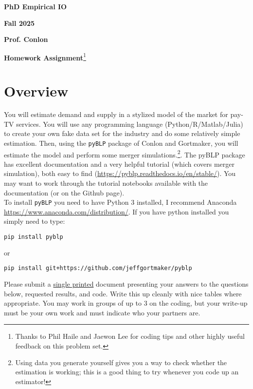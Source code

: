 \documentclass[english,11pt]{article}
\begin{document}
\begin{center}
\textbf{PhD Empirical IO}

\textbf{Fall 2025}

\textbf{Prof. Conlon}

\textbf{Homework Assignment}\footnote{Thanks to Phil Haile and Jaewon Lee for coding tips and other highly useful feedback on this problem set.}


\end{center}

\bigskip

\section*{Overview}

You will estimate demand and supply in a stylized model of the market for
pay-TV services. You will use any programming language (Python/R/Matlab/Julia) to create your own fake data set for the industry and do some
relatively simple estimation. Then, using the \texttt{pyBLP} package of Conlon and Gortmaker, you will
estimate the model and perform some merger simulations.\footnote{%
Using data you generate yourself gives you a way to check whether the
estimation is working; this is a good thing to try whenever you code up an
estimator!}. The pyBLP package has excellent
documentation and a very helpful tutorial (which covers merger simulation),
both easy to find (\url{https://pyblp.readthedocs.io/en/stable/}). You may want to work through the tutorial notebooks available with the documentation (or on the Github page).\\


To install \texttt{pyBLP} you need to have Python 3 installed, I recommend Anaconda \url{https://www.anaconda.com/distribution/}. If you have python installed you simply need to type:
\begin{verbatim}
pip install pyblp
\end{verbatim}
or 
\begin{verbatim}
pip install git+https://github.com/jeffgortmaker/pyblp
\end{verbatim}

Please submit a \underline{single printed} document presenting your answers to the questions below,
requested results, and code. Write this up cleanly with nice tables where appropriate.
You may work in groups of up to 3 on the coding, but your write-up must be your own work and must indicate who your partners are.
\end{document}
